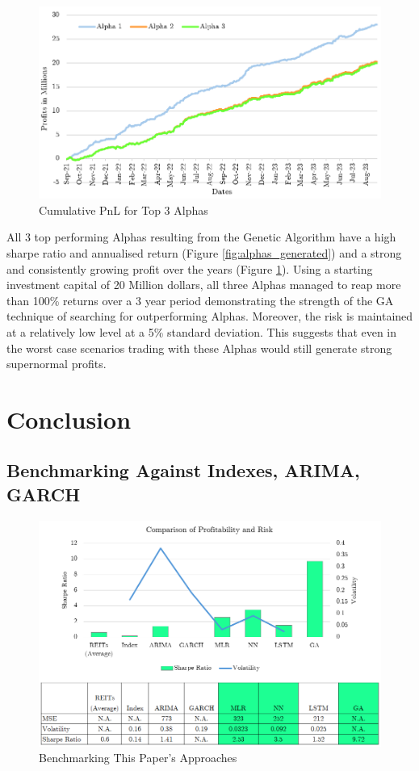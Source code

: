 \documentclass[a4paper,12pt]{report}
\numberwithin{equation}{section}
\theoremstyle{definition}
\begin{document}
\begin{figure}[H]
  \centerline{\includegraphics[width=15cm]{Alphas Profit Over Time}}
  \caption{Cumulative PnL for Top 3 Alphas}
  \label{fig:pnl_top_3}
\end{figure}
All 3 top performing Alphas resulting from the Genetic Algorithm have a high sharpe ratio and annualised return (Figure \ref{fig:alphas_generated}) and a strong and consistently growing profit over the years (Figure \ref{fig:pnl_top_3}). Using a starting investment capital of 20 Million dollars, all three Alphas managed to reap more than 100\% returns over a 3 year period demonstrating the strength of the GA technique of searching for outperforming Alphas. Moreover, the risk is maintained at a relatively low level at a 5\% standard deviation. This suggests that even in the worst case scenarios trading with these Alphas would still generate strong supernormal profits.


\chapter{Conclusion}
\section{Benchmarking Against Indexes, ARIMA, GARCH}
\begin{figure}[H]
  \centerline{\includegraphics[width=20cm]{final comparison}}
  \caption{Benchmarking This Paper's Approaches}
  \label{fig:final_comparison}
\end{figure}
\end{document}
